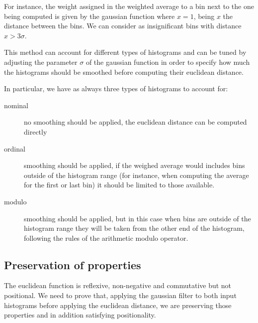 For instance, the weight assigned in the weighted average to a bin next to the one being computed is given by the gaussian function where $x = 1$, being $x$ the distance between the bins. We can consider as insignificant bins with distance $x > 3\sigma$.

This method can account for different types of histograms and can be tuned by adjusting the parameter $\sigma$ of the gaussian function in order to specify how much the histograms should be smoothed before computing their euclidean distance.

In particular, we have as always three types of histograms to account for:

\begin{description}
  \item[nominal] no smoothing should be applied, the euclidean distance can be computed directly
  \item[ordinal] smoothing should be applied, if the weighed average would includes bins outside of the histogram range (for instance, when computing the average for the first or last bin) it should be limited to those available.
  \item[modulo] smoothing should be applied, but in this case when bins are outside of the histogram range they will be taken from the other end of the histogram, following the rules of the arithmetic modulo operator.
\end{description}

\subsection{Preservation of properties}

The euclidean function is reflexive, non-negative and commutative but not positional. We need to prove that, applying the gaussian filter to both input histograms before applying the euclidean distance, we are preserving those properties and in addition satisfying positionality.

